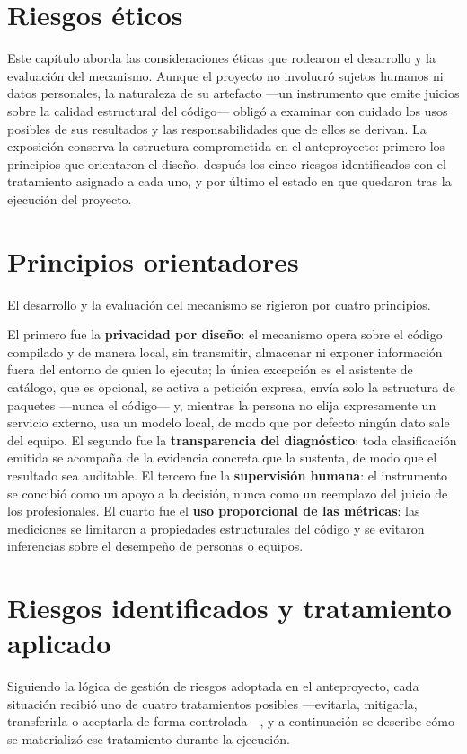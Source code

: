 \section{Riesgos éticos}
Este capítulo aborda las consideraciones éticas que rodearon el desarrollo y la evaluación del mecanismo. Aunque el proyecto no involucró sujetos humanos ni datos personales, la naturaleza de su artefacto —un instrumento que emite juicios sobre la calidad estructural del código— obligó a examinar con cuidado los usos posibles de sus resultados y las responsabilidades que de ellos se derivan. La exposición conserva la estructura comprometida en el anteproyecto: primero los principios que orientaron el diseño, después los cinco riesgos identificados con el tratamiento asignado a cada uno, y por último el estado en que quedaron tras la ejecución del proyecto.

\section{Principios orientadores}
El desarrollo y la evaluación del mecanismo se rigieron por cuatro principios.

El primero fue la \textbf{privacidad por diseño}: el mecanismo opera sobre el código compilado y de manera local, sin transmitir, almacenar ni exponer información fuera del entorno de quien lo ejecuta; la única excepción es el asistente de catálogo, que es opcional, se activa a petición expresa, envía solo la estructura de paquetes ---nunca el código--- y, mientras la persona no elija expresamente un servicio externo, usa un modelo local, de modo que por defecto ningún dato sale del equipo. El segundo fue la \textbf{transparencia del diagnóstico}: toda clasificación emitida se acompaña de la evidencia concreta que la sustenta, de modo que el resultado sea auditable. El tercero fue la \textbf{supervisión humana}: el instrumento se concibió como un apoyo a la decisión, nunca como un reemplazo del juicio de los profesionales. El cuarto fue el \textbf{uso proporcional de las métricas}: las mediciones se limitaron a propiedades estructurales del código y se evitaron inferencias sobre el desempeño de personas o equipos.

\section{Riesgos identificados y tratamiento aplicado}
Siguiendo la lógica de gestión de riesgos adoptada en el anteproyecto, cada situación recibió uno de cuatro tratamientos posibles —evitarla, mitigarla, transferirla o aceptarla de forma controlada—, y a continuación se describe cómo se materializó ese tratamiento durante la ejecución.

